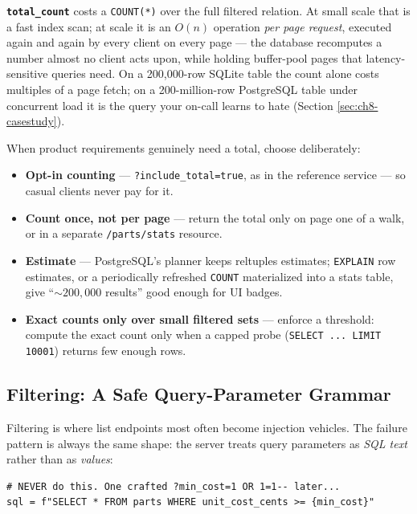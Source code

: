 \textbf{\texttt{total\_count}} costs a \texttt{COUNT(*)} over the full
filtered relation. At small scale that is a fast index scan; at scale it is
an $O(n)$ operation \emph{per page request}, executed again and again by
every client on every page --- the database recomputes a number almost no
client acts upon, while holding buffer-pool pages that latency-sensitive
queries need. On a 200{,}000-row SQLite table the count alone costs
multiples of a page fetch; on a 200-million-row PostgreSQL table under
concurrent load it is the query your on-call learns to hate (Section
\ref{sec:ch8-casestudy}).

When product requirements genuinely need a total, choose deliberately:

\begin{itemize}
  \item \textbf{Opt-in counting} --- \texttt{?include\_total=true}, as in the
        reference service --- so casual clients never pay for it.
  \item \textbf{Count once, not per page} --- return the total only on page
        one of a walk, or in a separate \texttt{/parts/stats} resource.
  \item \textbf{Estimate} --- PostgreSQL's planner keeps reltuples estimates;
        \texttt{EXPLAIN} row estimates, or a periodically refreshed
        \texttt{COUNT} materialized into a stats table, give
        ``${\sim}200{,}000$ results'' good enough for UI badges.
  \item \textbf{Exact counts only over small filtered sets} --- enforce a
        threshold: compute the exact count only when a capped probe
        (\texttt{SELECT ... LIMIT 10001}) returns few enough rows.
\end{itemize}

\subsection{Filtering: A Safe Query-Parameter Grammar}
\label{subsec:ch8-filtering}

Filtering is where list endpoints most often become injection vehicles. The
failure pattern is always the same shape: the server treats query parameters
as \emph{SQL text} rather than as \emph{values}:

\begin{verbatim}
# NEVER do this. One crafted ?min_cost=1 OR 1=1-- later...
sql = f"SELECT * FROM parts WHERE unit_cost_cents >= {min_cost}"
\end{verbatim}

